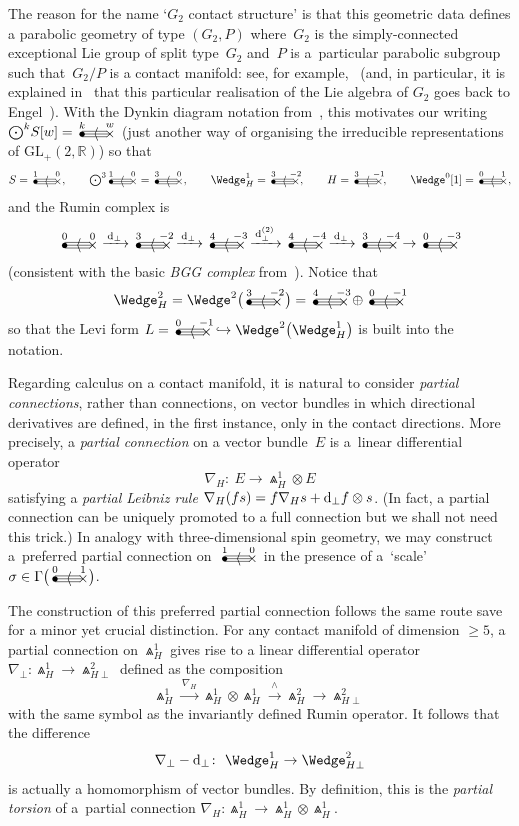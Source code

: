 \documentclass[pdftex]{sigma}%
\numberwithin{equation}{section}
\newcommand{\gtwo}[2]{\begin{picture}(28,10)
\put(4,1.1){\makebox(0,0){$\bullet$}}
\put(24,1.5){\makebox(0,0){$\times$}}
\put(4,3.5){\line(1,0){18}}
\put(4,1.5){\line(1,0){20}}
\put(4,-.5){\line(1,0){18}}
\put(14,1.5){\makebox(0,0){$\langle$}}
\put(4,8){\makebox(0,0){$\scriptstyle #1$}}
\put(24,8){\makebox(0,0){$\scriptstyle #2$}}
\end{picture}}
\begin{document}
The reason for the name `$G_2$ contact structure' is that this geometric data
defines a parabolic geometry of type $(G_2,P)$ where~$G_2$ is the
simply-connected exceptional Lie group of split type~$G_2$ and~$P$ is a~particular parabolic subgroup such that~$G_2/P$ is a contact manifold: see, for
example,~\cite[Section~4.2.8]{CS} (and, in particular, it is explained in~\cite{EN1}
that this particular realisation of the Lie algebra of $G_2$ goes back to
Engel~\cite{E}). With the Dynkin diagram notation from~\cite{BE}, this
motivates our writing $\bigodot^k\!S[w]=\gtwo{k}{w}$ (just another way of
organising the irreducible representations of
${\mathrm{GL}}_+(2,{\mathbb{R}})$) so that
\begin{gather*} \textstyle S=\gtwo{1}{0},\qquad \bigodot^3\!\gtwo{1}{0}=\gtwo{3}{0},\qquad
\Wedge_H^1=\gtwo{3}{-2},\qquad H=\gtwo{3}{-1},\qquad\Wedge^0[1]=\gtwo{0}{1},
\end{gather*}
and the Rumin complex is
\[\gtwo{0}{0}\xrightarrow{\,{\rm d}_\perp\,}\gtwo{3}{-2}
\xrightarrow{\,{\rm d}_\perp\,}\gtwo{4}{-3}
\xrightarrow{\,{\rm d}_\perp^{(2)}\,}\gtwo{4}{-4}
\xrightarrow{\,{\rm d}_\perp\,}\gtwo{3}{-4}\to
\gtwo{0}{-3}\]
(consistent with the basic {\em BGG complex} from~\cite{BE}). Notice that
\[\Wedge_H^2=\Wedge^2\big(\gtwo{3}{-2}\,\big)
=\gtwo{4}{-3}\oplus\gtwo{0}{-1}\]
so that the Levi form $L=\gtwo{0}{-1}\hookrightarrow\Wedge^2\big({\Wedge}_H^1\big)$ is
built into the notation.

Regarding calculus on a contact manifold, it is natural to consider
{\em partial connections}, rather than connections, on vector bundles in which
directional derivatives are defined, in the first instance, only in the contact
directions. More precisely, a {\em partial connection} on a vector bundle~$E$
is a~linear differential operator
\[\nabla_H\colon \ E\to\Wedge_H^1\otimes E\]
satisfying a {\em partial Leibniz rule} $\nabla_H(fs)=f\nabla_Hs+{\rm d}_\perp
f\otimes s$. (In fact, a partial connection can be uniquely promoted
\cite[Proposition~3.5]{EG} to a full connection but we shall not need this
trick.) In analogy with three-dimensional spin geometry, we may construct a~preferred partial connection on~$\gtwo{1}{0}$ in the presence of a~`scale'
$\sigma\in\Gamma\big(\gtwo{0}{1}\big)$.

The construction of this preferred partial connection follows the same route
save for a minor yet crucial distinction. For any contact manifold of dimension
$\geq 5$, a partial connection on $\Wedge_H^1$ gives rise to a linear
differential operator $\nabla_\perp\colon \Wedge_H^1\to\Wedge_{H\perp}^2$ defined as
the composition
\[\Wedge_H^1\xrightarrow{\,\nabla_H\,}
\Wedge_H^1\otimes\Wedge_H^1\xrightarrow{\,\wedge\,}
\Wedge_H^2\to\Wedge_{H\perp}^2\]
with the same symbol as the invariantly defined Rumin operator. It follows
that the difference
\[\nabla_\perp-{\rm d}_\perp\colon \ \Wedge_H^1\to\Wedge_{H\perp}^2\]
is actually a homomorphism of vector bundles. By definition, this is the
{\em partial torsion} of a~partial connection
$\nabla_H\colon \Wedge_H^1\to\Wedge_H^1\otimes\Wedge_H^1$.
\end{document}
